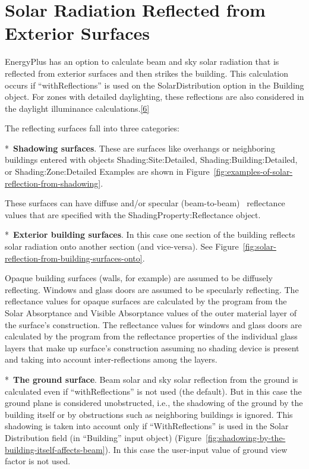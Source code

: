\chapter{Solar Radiation Reflected from Exterior Surfaces}\label{solar-radiation-reflected-from-exterior-surfaces}

EnergyPlus has an option to calculate beam and sky solar radiation that is reflected from exterior surfaces and then strikes the building. This calculation occurs if ``withReflections'' is used on the SolarDistribution option in the Building object. For zones with detailed daylighting, these reflections are also considered in the daylight illuminance calculations.\protect\hyperlink{ux5fftn6}{{[}6{]}}

The reflecting surfaces fall into three categories:

*~\textbf{Shadowing surfaces}. These are surfaces like overhangs or neighboring buildings entered with objects Shading:Site:Detailed, Shading:Building:Detailed, or Shading:Zone:Detailed Examples are shown in Figure~\ref{fig:examples-of-solar-reflection-from-shadowing}.

These surfaces can have diffuse and/or specular (beam-to-beam)~ reflectance values that are specified with the ShadingProperty:Reflectance object.

*~\textbf{Exterior building surfaces}. In this case one section of the building reflects solar radiation onto another section (and vice-versa). See Figure~\ref{fig:solar-reflection-from-building-surfaces-onto}.

Opaque building surfaces (walls, for example) are assumed to be diffusely reflecting. Windows and glass doors are assumed to be specularly reflecting. The reflectance values for opaque surfaces are calculated by the program from the Solar Absorptance and Visible Absorptance values of the outer material layer of the surface's construction. The reflectance values for windows and glass doors are calculated by the program from the reflectance properties of the individual glass layers that make up surface's construction assuming no shading device is present and taking into account inter-reflections among the layers.

*~\textbf{The ground surface}. Beam solar and sky solar reflection from the ground is calculated even if ``withReflections'' is not used (the default). But in this case the ground plane is considered unobstructed, i.e., the shadowing of the ground by the building itself or by obstructions such as neighboring buildings is ignored. This shadowing is taken into account only if ``WithReflections'' is used in the Solar Distribution field (in ``Building'' input object) (Figure~\ref{fig:shadowing-by-the-building-itself-affects-beam}). In this case the user-input value of ground view factor is not used.

